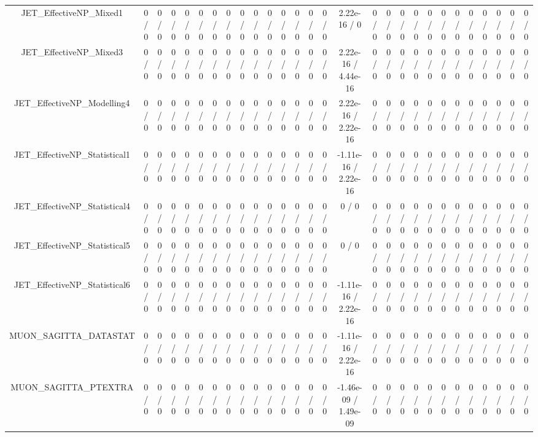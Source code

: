 \documentclass[10pt]{article}
\begin{document}
\begin{table}[htbp]
\begin{center}
\begin{tabular}{|c|c|c|c|c|c|c|c|c|c|c|c|c|c|c|c|c|c|c|c|c|c|c|c|c|c|c|c|}
  JET_EffectiveNP_Mixed1 & 0 / 0 & 0 / 0 & 0 / 0 & 0 / 0 & 0 / 0 & 0 / 0 & 0 / 0 & 0 / 0 & 0 / 0 & 0 / 0 & 0 / 0 & 0 / 0 & 0 / 0 & 0 / 0 & 2.22e-16 / 0 & 0 / 0 & 0 / 0 & 0 / 0 & 0 / 0 & 0 / 0 & 0 / 0 & 0 / 0 & 0 / 0 & 0 / 0 & 0 / 0 & 0 / 0 & 0 / 0 \\ 
  JET_EffectiveNP_Mixed3 & 0 / 0 & 0 / 0 & 0 / 0 & 0 / 0 & 0 / 0 & 0 / 0 & 0 / 0 & 0 / 0 & 0 / 0 & 0 / 0 & 0 / 0 & 0 / 0 & 0 / 0 & 0 / 0 & 2.22e-16 / 4.44e-16 & 0 / 0 & 0 / 0 & 0 / 0 & 0 / 0 & 0 / 0 & 0 / 0 & 0 / 0 & 0 / 0 & 0 / 0 & 0 / 0 & 0 / 0 & 0 / 0 \\ 
  JET_EffectiveNP_Modelling4 & 0 / 0 & 0 / 0 & 0 / 0 & 0 / 0 & 0 / 0 & 0 / 0 & 0 / 0 & 0 / 0 & 0 / 0 & 0 / 0 & 0 / 0 & 0 / 0 & 0 / 0 & 0 / 0 & 2.22e-16 / 2.22e-16 & 0 / 0 & 0 / 0 & 0 / 0 & 0 / 0 & 0 / 0 & 0 / 0 & 0 / 0 & 0 / 0 & 0 / 0 & 0 / 0 & 0 / 0 & 0 / 0 \\ 
  JET_EffectiveNP_Statistical1 & 0 / 0 & 0 / 0 & 0 / 0 & 0 / 0 & 0 / 0 & 0 / 0 & 0 / 0 & 0 / 0 & 0 / 0 & 0 / 0 & 0 / 0 & 0 / 0 & 0 / 0 & 0 / 0 & -1.11e-16 / 2.22e-16 & 0 / 0 & 0 / 0 & 0 / 0 & 0 / 0 & 0 / 0 & 0 / 0 & 0 / 0 & 0 / 0 & 0 / 0 & 0 / 0 & 0 / 0 & 0 / 0 \\ 
  JET_EffectiveNP_Statistical4 & 0 / 0 & 0 / 0 & 0 / 0 & 0 / 0 & 0 / 0 & 0 / 0 & 0 / 0 & 0 / 0 & 0 / 0 & 0 / 0 & 0 / 0 & 0 / 0 & 0 / 0 & 0 / 0 & 0 / 0 & 0 / 0 & 0 / 0 & 0 / 0 & 0 / 0 & 0 / 0 & 0 / 0 & 0 / 0 & 0 / 0 & 0 / 0 & 0 / 0 & 0 / 0 & 0 / 0 \\ 
  JET_EffectiveNP_Statistical5 & 0 / 0 & 0 / 0 & 0 / 0 & 0 / 0 & 0 / 0 & 0 / 0 & 0 / 0 & 0 / 0 & 0 / 0 & 0 / 0 & 0 / 0 & 0 / 0 & 0 / 0 & 0 / 0 & 0 / 0 & 0 / 0 & 0 / 0 & 0 / 0 & 0 / 0 & 0 / 0 & 0 / 0 & 0 / 0 & 0 / 0 & 0 / 0 & 0 / 0 & 0 / 0 & 0 / 0 \\ 
  JET_EffectiveNP_Statistical6 & 0 / 0 & 0 / 0 & 0 / 0 & 0 / 0 & 0 / 0 & 0 / 0 & 0 / 0 & 0 / 0 & 0 / 0 & 0 / 0 & 0 / 0 & 0 / 0 & 0 / 0 & 0 / 0 & -1.11e-16 / 2.22e-16 & 0 / 0 & 0 / 0 & 0 / 0 & 0 / 0 & 0 / 0 & 0 / 0 & 0 / 0 & 0 / 0 & 0 / 0 & 0 / 0 & 0 / 0 & 0 / 0 \\ 
  MUON_SAGITTA_DATASTAT & 0 / 0 & 0 / 0 & 0 / 0 & 0 / 0 & 0 / 0 & 0 / 0 & 0 / 0 & 0 / 0 & 0 / 0 & 0 / 0 & 0 / 0 & 0 / 0 & 0 / 0 & 0 / 0 & -1.11e-16 / 2.22e-16 & 0 / 0 & 0 / 0 & 0 / 0 & 0 / 0 & 0 / 0 & 0 / 0 & 0 / 0 & 0 / 0 & 0 / 0 & 0 / 0 & 0 / 0 & 0 / 0 \\ 
  MUON_SAGITTA_PTEXTRA & 0 / 0 & 0 / 0 & 0 / 0 & 0 / 0 & 0 / 0 & 0 / 0 & 0 / 0 & 0 / 0 & 0 / 0 & 0 / 0 & 0 / 0 & 0 / 0 & 0 / 0 & 0 / 0 & -1.46e-09 / 1.49e-09 & 0 / 0 & 0 / 0 & 0 / 0 & 0 / 0 & 0 / 0 & 0 / 0 & 0 / 0 & 0 / 0 & 0 / 0 & 0 / 0 & 0 / 0 & 0 / 0 \\ 

\end{tabular}
\end{center}
\end{table}
\end{document}
